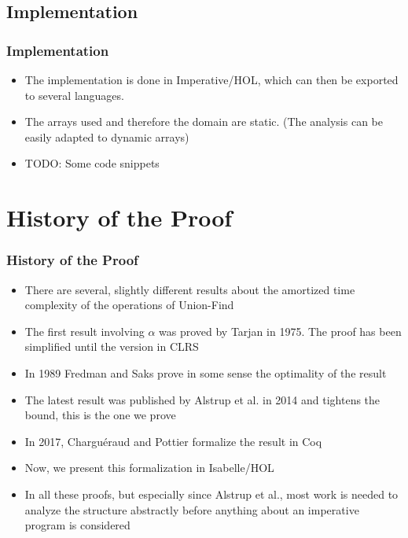 \subsection{Implementation}
\begin{frame}
	\frametitle{Implementation}
	\begin{itemize}
		\item The implementation is done in Imperative/HOL, which can then be exported to several languages.
		\item The arrays used and therefore the domain are static. (The analysis can be easily adapted to dynamic arrays)
		\item TODO: Some code snippets
	\end{itemize}
\end{frame}

\section{History of the Proof}
\begin{frame}
	\frametitle{History of the Proof}
	\begin{itemize}
		\item There are several, slightly different results about the amortized time complexity of the operations of Union-Find
		\item The first result involving $\alpha$ was proved by Tarjan in 1975. The proof has been simplified until the version in CLRS
		\item In 1989 Fredman and Saks prove in some sense the optimality of the result
		\item The latest result was published by Alstrup et al. in 2014 and tightens the bound, this is the one we prove
		\item In 2017, Charguéraud and Pottier formalize the result in Coq
		\item Now, we present this formalization in Isabelle/HOL
		\item In all these proofs, but especially since Alstrup et al., most work is needed to analyze the structure abstractly before anything about an imperative program is considered
	\end{itemize}
\end{frame}


